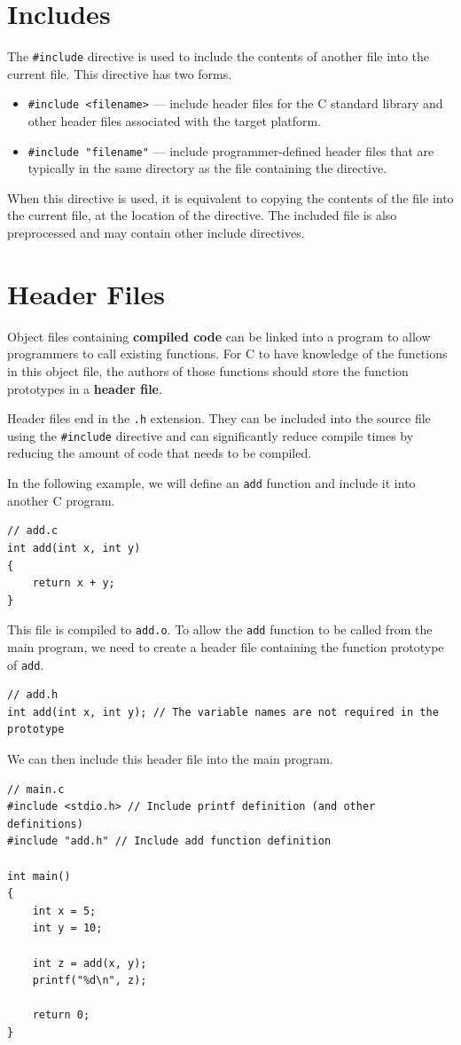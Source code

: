\documentclass{report}
\begin{document}
\section{Includes}
The \texttt{#include} directive is used to include the contents of another file into the current file.
This directive has two forms.
\begin{itemize}
    \item \texttt{#include <filename>} --- include header files for the C standard library and other header files associated with the target platform.
    \item \texttt{#include "filename"} --- include programmer-defined header files that are typically in the same directory as the file containing the directive. %
\end{itemize}
When this directive is used, it is equivalent to copying the contents of the file into the current file,
at the location of the directive. The included file is also preprocessed and may contain other include directives.
\section{Header Files}
Object files containing \textbf{compiled code} can be linked into a program to allow programmers to
call existing functions. For C to have knowledge of the functions in this object file,
the authors of those functions should store the function prototypes in a \textbf{header file}.

Header files end in the \texttt{.h} extension.
They can be included into the source file using the \texttt{#include} directive and can significantly
reduce compile times by reducing the amount of code that needs to be compiled.

In the following example, we will define an \texttt{add} function and include
it into another C program.
\begin{verbatim}
// add.c
int add(int x, int y)
{
    return x + y;
}
\end{verbatim}
This file is compiled to \texttt{add.o}. To allow the \texttt{add} function to be called from the main program,
we need to create a header file containing the function prototype of \texttt{add}.
\begin{verbatim}
// add.h
int add(int x, int y); // The variable names are not required in the prototype
\end{verbatim}
We can then include this header file into the main program.
\begin{verbatim}
// main.c
#include <stdio.h> // Include printf definition (and other definitions)
#include "add.h" // Include add function definition

int main()
{
    int x = 5;
    int y = 10;

    int z = add(x, y);
    printf("%d\n", z);

    return 0;
}
\end{verbatim}
\end{document}

